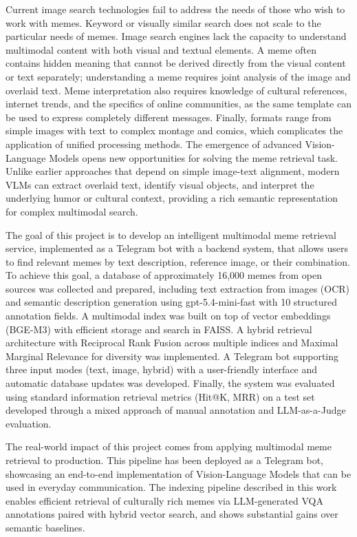 \documentclass[a4paper,12pt]{article}
\begin{document}
Current image search technologies fail to address the needs of those who wish to work with memes. Keyword or visually similar search does not scale to the particular needs of memes. Image search engines lack the capacity to understand multimodal content with both visual and textual elements. A meme often contains hidden meaning that cannot be derived directly from the visual content or text separately; understanding a meme requires joint analysis of the image and overlaid text. Meme interpretation also requires knowledge of cultural references, internet trends, and the specifics of online communities, as the same template can be used to express completely different messages. Finally, formats range from simple images with text to complex montage and comics, which complicates the application of unified processing methods. The emergence of advanced Vision-Language Models opens new opportunities for solving the meme retrieval task. Unlike earlier approaches that depend on simple image-text alignment, modern VLMs can extract overlaid text, identify visual objects, and interpret the underlying humor or cultural context, providing a rich semantic representation for complex multimodal search.

The goal of this project is to develop an intelligent multimodal meme retrieval service, implemented as a Telegram bot with a backend system, that allows users to find relevant memes by text description, reference image, or their combination. To achieve this goal, a database of approximately 16,000 memes from open sources was collected and prepared, including text extraction from images (OCR) and semantic description generation using gpt-5.4-mini-fast with 10 structured annotation fields. A multimodal index was built on top of vector embeddings (BGE-M3) with efficient storage and search in FAISS. A hybrid retrieval architecture with Reciprocal Rank Fusion across multiple indices and Maximal Marginal Relevance for diversity was implemented. A Telegram bot supporting three input modes (text, image, hybrid) with a user-friendly interface and automatic database updates was developed. Finally, the system was evaluated using standard information retrieval metrics (Hit@K, MRR) on a test set developed through a mixed approach of manual annotation and LLM-as-a-Judge evaluation.

The real-world impact of this project comes from applying multimodal meme retrieval to production. This pipeline has been deployed as a Telegram bot, showcasing an end-to-end implementation of Vision-Language Models that can be used in everyday communication. The indexing pipeline described in this work enables efficient retrieval of culturally rich memes via LLM-generated VQA annotations paired with hybrid vector search, and shows substantial gains over semantic baselines.
\end{document}
